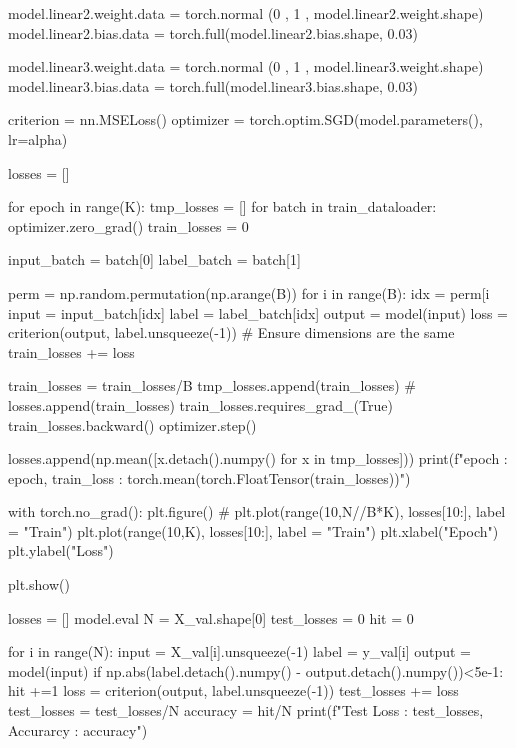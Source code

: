 \documentclass[10pt]{article}
\begin{document}
\begin{python}
    model.linear2.weight.data = torch.normal (0 , 1 , model.linear2.weight.shape)
    model.linear2.bias.data = torch.full(model.linear2.bias.shape, 0.03)
    
    model.linear3.weight.data = torch.normal (0 , 1 , model.linear3.weight.shape)
    model.linear3.bias.data = torch.full(model.linear3.bias.shape, 0.03)
    
    criterion = nn.MSELoss()
    optimizer = torch.optim.SGD(model.parameters(), lr=alpha)
    
    losses = []
    
    for epoch in range(K):
        tmp_losses = []
        for batch in train_dataloader: 
            optimizer.zero_grad()
            train_losses = 0
    
            input_batch = batch[0]
            label_batch = batch[1]
    
            perm = np.random.permutation(np.arange(B)) 
            for i in range(B):
                idx = perm[i%
                input = input_batch[idx]
                label = label_batch[idx]
                output = model(input)
                loss = criterion(output, label.unsqueeze(-1)) # Ensure dimensions are the same
                train_losses += loss
    
            train_losses = train_losses/B
            tmp_losses.append(train_losses)
            # losses.append(train_losses)
            train_losses.requires_grad_(True)
            train_losses.backward()
            optimizer.step()
    
        losses.append(np.mean([x.detach().numpy()  for x in tmp_losses]))
        print(f"epoch : {epoch}, train_loss : {torch.mean(torch.FloatTensor(train_losses))}")
    
    with torch.no_grad():
        plt.figure()
        # plt.plot(range(10,N//B*K), losses[10:], label = "Train")
        plt.plot(range(10,K), losses[10:], label = "Train")
        plt.xlabel("Epoch")
        plt.ylabel("Loss")
    
    plt.show()
    
    losses = []
    model.eval
    N = X_val.shape[0]
    test_losses = 0
    hit = 0
    
    for i in range(N):
        input = X_val[i].unsqueeze(-1)
        label = y_val[i]
        output = model(input)
        if np.abs(label.detach().numpy() - output.detach().numpy())<5e-1:
            hit +=1
        loss = criterion(output, label.unsqueeze(-1))
        test_losses += loss
    test_losses = test_losses/N
    accuracy = hit/N
    print(f"Test Loss : {test_losses}, Accurarcy : {accuracy}")
    

\end{python}
\end{document}

